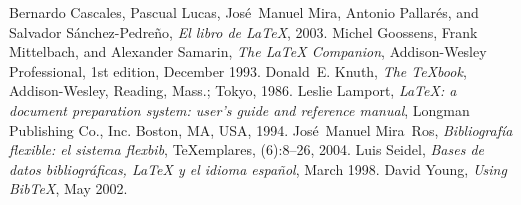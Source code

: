 \documentclass[11pt,a4paper]{article}
\begin{document}
%
%
%

%


%
\begin{thebibliography}{123456789112345678}
%
Bernardo Cascales, Pascual Lucas, José~Manuel Mira, Antonio Pallarés, and
  Salvador Sánchez-Pedreño, \emph{El libro de \LaTeX}, 2003.
%
Michel Goossens, Frank Mittelbach, and Alexander Samarin, \emph{The \LaTeX{} Companion}, 
Addison-Wesley Professional, 1st edition, December 1993.
%
Donald~E. Knuth, \emph{The \TeX book}, Addison-Wesley, Reading, Mass.; Tokyo, 1986.
%
Leslie Lamport, \emph{\LaTeX: a document preparation system: user's guide and
  reference manual}, Longman Publishing Co., Inc. Boston, MA, USA, 1994.
%
José~Manuel Mira~Ros,  \emph{Bibliografía flexible: el sistema flexbib}, TeXemplares, (6):8--26, 2004.
%
Luis Seidel, \emph{Bases de datos bibliográficas, LaTeX y el idioma español}, March 1998.
%
David Young,  \emph{Using Bib\TeX}, May 2002.
%
\end{thebibliography}

\tableofcontents
\listoftables
\end{document}
